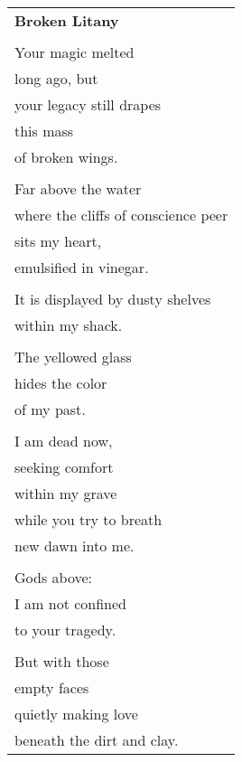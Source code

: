\documentclass{article}
\begin{document}
\begin{center}
\begin{tabular}{l}
\textbf{Broken Litany} \\
\\
Your magic melted \\
long ago, but \\
your legacy still drapes \\
this mass \\
of broken wings. \\
\\
Far above the water \\
where the cliffs of conscience peer \\
sits my heart, \\
emulsified in vinegar. \\
\\
It is displayed by dusty shelves \\
within my shack. \\
\\
The yellowed glass \\
hides the color \\
of my past. \\
\\
I am dead now, \\
seeking comfort \\
within my grave \\ %
while you try to breath \\
new dawn into me. \\
\\
Gods above: \\
I am not confined \\
to your tragedy. \\
\\
But with those \\
empty faces \\
quietly making love \\
beneath the dirt and clay. \\
\end{tabular}
\end{center}
\end{document}
